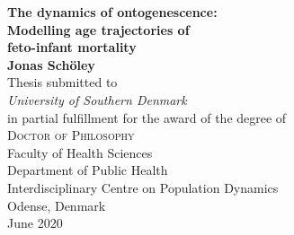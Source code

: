 \documentclass[10pt, twoside]{book}
\begin{document}
\begin{titlepage}
\begin{center}
{\huge\bfseries The dynamics of ontogenescence: \\ Modelling age trajectories of \\ feto-infant mortality\\}
  \vspace{1.5cm}
{\Large\bfseries Jonas Schöley}\\[5pt]
  \vspace{2cm}
{Thesis  submitted to} \\[5pt]
\emph{{University of Southern Denmark}}\\[2cm]
{in partial fulfillment for the award of the degree
  of} \\[2cm]
\textsc{\Large{{Doctor of Philosophy}}} \\[5pt]
\vfill
{Faculty of Health Sciences}\\[5pt]
{Department of Public Health}\\[5pt]
{Interdisciplinary Centre on Population Dynamics}\\
\vfill
{Odense, Denmark}\\[5pt]
{June 2020}
\end{center}
\end{titlepage}


\end{document}
